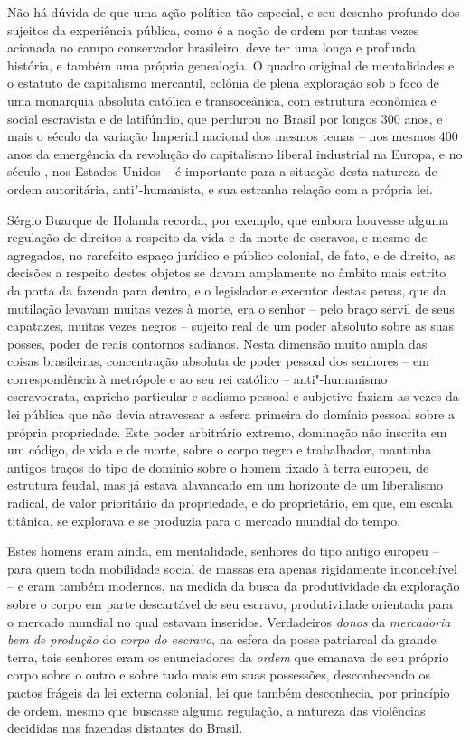 Não há dúvida de que uma ação política tão especial, e seu desenho profundo
dos sujeitos da experiência pública, como é a noção de ordem por tantas
vezes acionada no campo conservador brasileiro, deve ter uma longa e
profunda história, e também uma própria genealogia. O quadro original de
mentalidades e o estatuto de capitalismo mercantil, colônia de plena
exploração sob o foco de uma monarquia absoluta católica e
transoceânica, com estrutura econômica e social escravista e de
latifúndio, que perdurou no Brasil por longos 300 anos, e mais o século
da variação Imperial nacional dos mesmos temas -- nos mesmos 400 anos da
emergência da revolução do capitalismo liberal industrial na Europa, e
no século , nos Estados Unidos -- é importante para a situação desta
natureza de ordem autoritária, anti"-humanista, e sua estranha relação
com a própria lei.

Sérgio Buarque de Holanda recorda, por exemplo, que embora houvesse
alguma regulação de direitos a respeito da vida e da morte de escravos,
e mesmo de agregados, no rarefeito espaço jurídico e público colonial,
de fato, e de direito, as decisões a respeito destes objetos se davam
amplamente no âmbito mais estrito da porta da fazenda para dentro, e o
legislador e executor destas penas, que da mutilação levavam muitas
vezes à morte, era o senhor -- pelo braço servil de seus capatazes,
muitas vezes negros -- sujeito real de um poder absoluto sobre as suas
posses, poder de reais contornos sadianos. Nesta dimensão muito ampla
das coisas brasileiras, concentração absoluta de poder pessoal dos
senhores -- em correspondência à metrópole e ao seu rei católico --
anti"-humanismo escravocrata, capricho particular e sadismo pessoal e
subjetivo faziam as vezes da lei pública que não devia atravessar a
esfera primeira do domínio pessoal sobre a própria propriedade. Este
poder arbitrário extremo, dominação não inscrita em um código, de vida e
de morte, sobre o corpo negro e trabalhador, mantinha antigos traços do
tipo de domínio sobre o homem fixado à terra europeu, de estrutura
feudal, mas já estava alavancado em um horizonte de um liberalismo
radical, de valor prioritário da propriedade, e do proprietário, em que,
em escala titânica, se explorava e se produzia para o mercado mundial do
tempo.

Estes homens eram ainda, em mentalidade, senhores do tipo antigo europeu
-- para quem toda mobilidade social de massas era apenas rigidamente
inconcebível -- e eram também modernos, na medida da busca da
produtividade da exploração sobre o corpo em parte descartável de seu
escravo, produtividade orientada para o mercado mundial no qual estavam
inseridos. Verdadeiros \emph{donos} da \emph{mercadoria bem de produção}
do \emph{corpo do escravo}, na esfera da posse patriarcal da grande
terra, tais senhores eram os enunciadores da \emph{ordem} que emanava de
seu próprio corpo sobre o outro e sobre tudo mais em suas possessões,
desconhecendo os pactos frágeis da lei externa colonial, lei que também
desconhecia, por princípio de ordem, mesmo que buscasse alguma
regulação, a natureza das violências decididas nas fazendas distantes do
Brasil.

